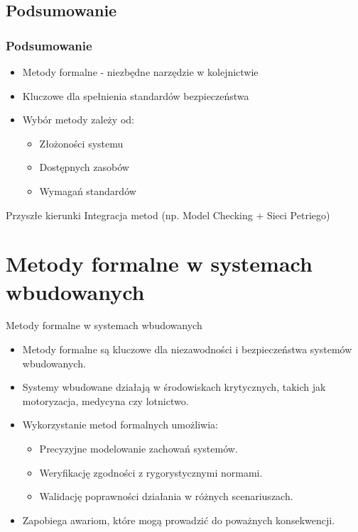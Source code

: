 \documentclass{beamer}
\begin{document}
\subsection{Podsumowanie}
\begin{frame}
\frametitle{Podsumowanie}
\begin{itemize}
\item Metody formalne - niezbędne narzędzie w kolejnictwie
\item Kluczowe dla spełnienia standardów bezpieczeństwa
\item Wybór metody zależy od:
\begin{itemize}
\item Złożoności systemu
\item Dostępnych zasobów
\item Wymagań standardów
\end{itemize}
\end{itemize}

\begin{block}{Przyszłe kierunki}
Integracja metod (np. Model Checking + Sieci Petriego)
\end{block}
\end{frame}

\section{Metody formalne w systemach wbudowanych}
\begin{frame}{Metody formalne w systemach wbudowanych}
  \begin{itemize}
    \item Metody formalne są kluczowe dla niezawodności i bezpieczeństwa systemów wbudowanych.
    \item Systemy wbudowane działają w środowiskach krytycznych, takich jak motoryzacja, medycyna czy lotnictwo.
    \item Wykorzystanie metod formalnych umożliwia:
      \begin{itemize}
        \item Precyzyjne modelowanie zachowań systemów.
        \item Weryfikację zgodności z rygorystycznymi normami.
        \item Walidację poprawności działania w różnych scenariuszach.
      \end{itemize}
    \item Zapobiega awariom, które mogą prowadzić do poważnych konsekwencji.
  \end{itemize}
\end{frame}
\end{document}
